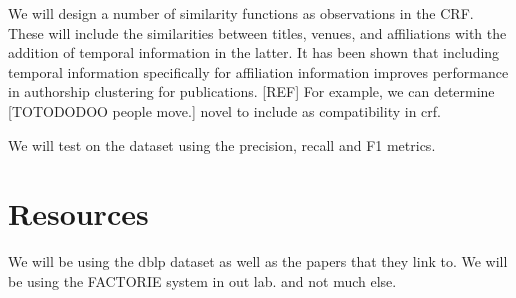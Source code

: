 \documentclass[]{article}
\begin{document}
We will design a number of similarity functions as observations in the CRF. These will include the similarities between titles, venues, and affiliations with the addition of temporal information in the latter. It has been shown that including temporal information specifically for affiliation information improves performance in authorship clustering for publications. [REF] For example, we can determine [TOTODODOO people move.] novel to include as compatibility in crf.

We will test on the dataset using the precision, recall and F1 metrics.

\section{Resources} %
\label{sec:resources}
We will be using the dblp dataset as well as the papers that they link to. We will be using the FACTORIE system in out lab. and not much else.



\end{document}
